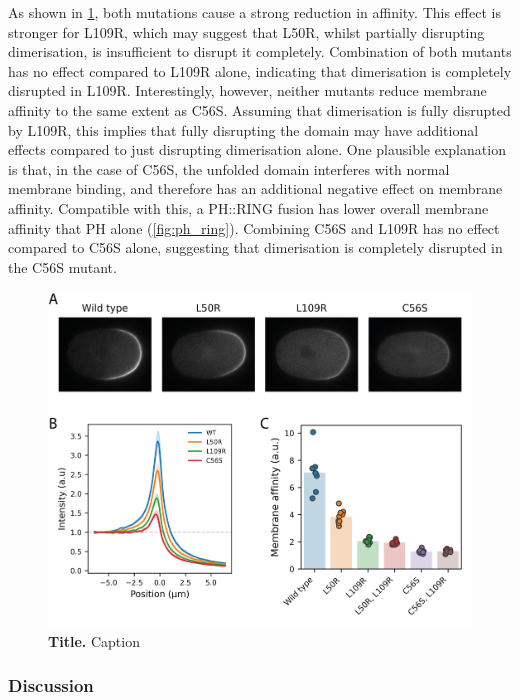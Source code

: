 \documentclass[12pt]{"article"}
\newcommand{\mycaption}[2]{\caption[#1]{\textbf{#1.} #2}}
\begin{document}
As shown in \cref{fig:dimer_interface_mutants_in_vivo}, both mutations cause a strong reduction in affinity. This effect is stronger for L109R, which may suggest that L50R, whilst partially disrupting dimerisation, is insufficient to disrupt it completely. Combination of both mutants has no effect compared to L109R alone, indicating that dimerisation is completely disrupted in L109R. Interestingly, however, neither mutants reduce membrane affinity to the same extent as C56S. Assuming that dimerisation is fully disrupted by L109R, this implies that fully disrupting the domain may have additional effects compared to just disrupting dimerisation alone. One plausible explanation is that, in the case of C56S, the unfolded domain interferes with normal membrane binding, and therefore has an additional negative effect on membrane affinity. Compatible with this, a PH::RING fusion has lower overall membrane affinity that PH alone (\cref{fig:ph_ring}). Combining C56S and L109R has no effect compared to C56S alone, suggesting that dimerisation is completely disrupted in the C56S mutant.\\

\begin{figure}[!h]
\includegraphics[scale=0.9]{dimer_interface_mutants_in_vivo}
\setlength{\abovecaptionskip}{20pt}
\centering
\mycaption{Title}{Caption}
\label{fig:dimer_interface_mutants_in_vivo}
\end{figure}

\clearpage
\subsubsection{Discussion}
\end{document}
